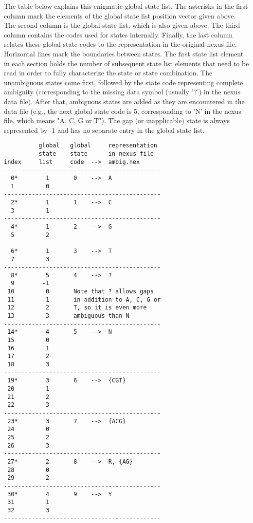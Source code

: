 \documentclass[12pt]{article}
\begin{document}
The table below explains this enigmatic global state list. The asterisks in the first column mark the elements of 
the global state list position vector given above. The second column is the global state list, which is also given 
above. The third column contains the codes used for states internally. Finally, the last column relates	these global 
state codes to the representation in the original nexus file. Horizontal lines mark the boundaries between states. 
The first state list element in each section holds the number of subsequent state list elements that need to be read
in order to fully characterize the state or state combination. The unambiguous states come first, followed by the 
state code representing complete ambiguity (corresponding to the missing data symbol (usually '?') in the nexus data
file). After that, ambiguous states are added as they are encountered in the data file (e.g., the next global state
code is 5, corresponding to 'N' in the nexus file, which means "A, C, G or T"). The gap (or inapplicable) state is 
always represented by -1 and has no separate entry in the global state list.

\begin{verbatim}
          global   global     representation
          state    state      in nexus file
index     list     code  -->  ambig.nex
---------------------------------------------
  0*        1       0    -->  A
  1         0
---------------------------------------------
  2*        1       1    -->  C
  3         1
---------------------------------------------
  4*        1       2    -->  G
  5         2
---------------------------------------------
  6*        1       3    -->  T
  7         3
---------------------------------------------
  8*        5       4    -->  ?
  9        -1                 
 10         0       Note that ? allows gaps
 11         1       in addition to A, C, G or
 12         2       T, so it is even more
 13         3       ambiguous than N
---------------------------------------------
 14*        4       5    -->  N
 15         0
 16         1
 17         2
 18         3
---------------------------------------------
 19*        3       6    -->  {CGT}
 20         1
 21         2
 22         3
---------------------------------------------
 23*        3       7    -->  {ACG}
 24         0
 25         2
 26         3
---------------------------------------------
 27*        2       8    -->  R, {AG}
 28         0
 29         2
---------------------------------------------
 30*        4       9    -->  Y
 31         1
 32         3
---------------------------------------------
\end{verbatim}
	
\end{document}
